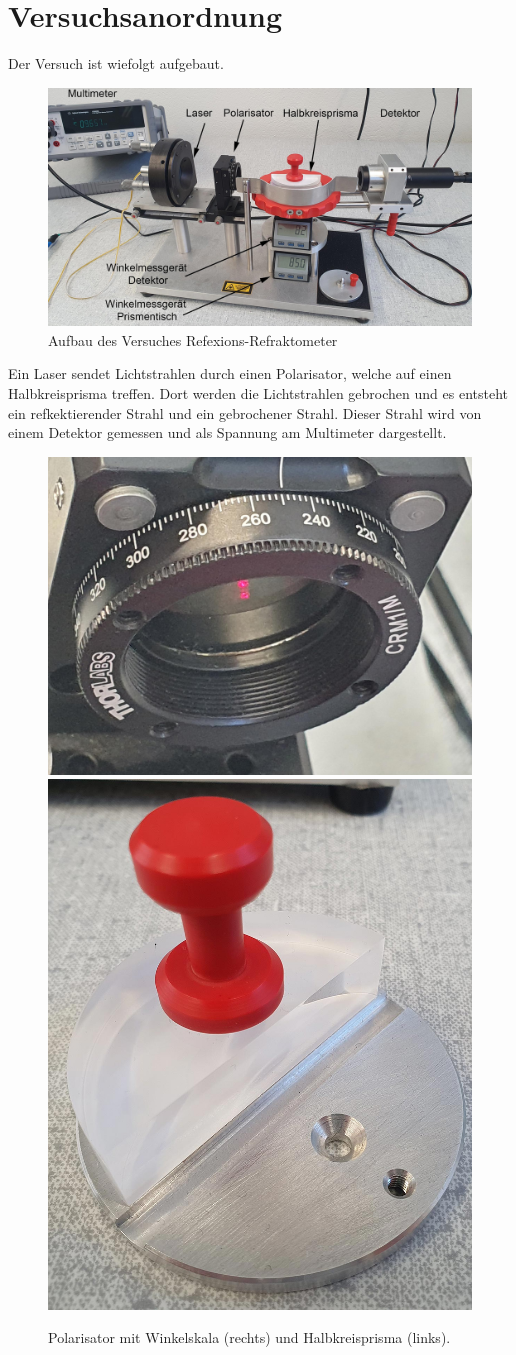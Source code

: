 \documentclass[12pt,a4paper,twoside]{article}
\begin{document}
\section{Versuchsanordnung} %
Der Versuch ist wiefolgt aufgebaut. 

\begin{figure}[H]
    \centering
    \includegraphics[width=0.7\linewidth]{nudes/Aufbau.jpg}
    \caption{Aufbau des Versuches Refexions-Refraktometer}
    \label{fig:aufbau}
\end{figure}

\noindent
Ein Laser sendet Lichtstrahlen durch einen Polarisator, welche auf einen Halbkreisprisma treffen. Dort werden die Lichtstrahlen gebrochen und es entsteht ein refkektierender Strahl und ein gebrochener Strahl. 
Dieser Strahl wird von einem Detektor gemessen und als Spannung am Multimeter dargestellt. 

\begin{figure}[H]
    \centering
    \includegraphics[width=0.4\linewidth]{nudes/Polarisator.jpg}
    \includegraphics[width=0.4\linewidth]{nudes/halbkreisprisma.jpg}
    \caption{Polarisator mit Winkelskala (rechts) und Halbkreisprisma (links). }
    \label{fig:Polarisator und prisma}
\end{figure}
\end{document}
